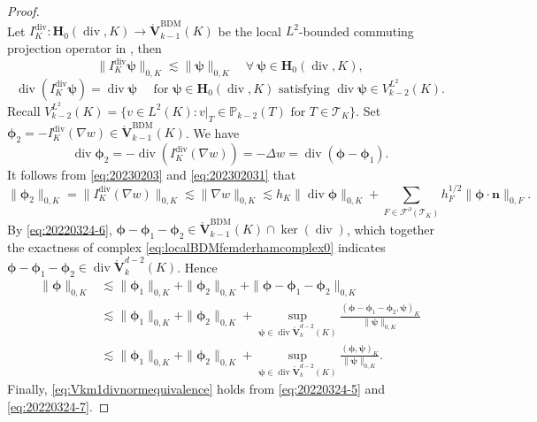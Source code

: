 \documentclass[10pt]{amsart}
\renewcommand{\div}{\operatorname{div}}
\numberwithin{equation}{section}
\begin{document}
\begin{proof}
\begin{equation}
\end{equation}
Let $I_K^{\div}: \boldsymbol{H}_0(\div,K)\to\mathring{\boldsymbol{V}}_{k-1}^{\mathrm{BDM}}(K)$ be the local $L^2$-bounded commuting projection operator in \cite{ArnoldGuzman2021,FalkWinther2014}, then
\begin{equation}\label{eq:20230203}  
\|I_K^{\div}\boldsymbol{\psi}\|_{0,K} \lesssim \|\boldsymbol{\psi}\|_{0,K}\quad\forall~\boldsymbol{\psi}\in \boldsymbol{H}_0(\div,K),
\end{equation}
\[
\div(I_K^{\div}\boldsymbol{\psi})=\div\boldsymbol{\psi} \quad \textrm{ for } \boldsymbol{\psi}\in \boldsymbol{H}_0(\div,K) \textrm{ satisfying } \div\boldsymbol{\psi}\in V_{k-2}^{L^2}(K).
\]
Recall $
V_{k-2}^{L^2}(K)=\{v\in L^2(K): v|_{T}\in \mathbb P_{k-2}(T) \textrm{ for } T\in\mathcal T_K\}
$. Set $\boldsymbol{\phi}_2=-I_K^{\div}(\nabla w)\in\mathring{\boldsymbol{V}}_{k-1}^{\mathrm{BDM}}(K)$. We have
\begin{equation}\label{eq:20220324-6}
\div\boldsymbol{\phi}_2=-\div(I_K^{\div}(\nabla w))=-\Delta w=\div(\boldsymbol{\phi}-\boldsymbol{\phi}_1).
\end{equation}
It follows from \eqref{eq:20230203} and \eqref{eq:202302031} that
\begin{equation}\label{eq:20220324-7}
\|\boldsymbol{\phi}_2\|_{0,K}=\|I_K^{\div}(\nabla w)\|_{0,K}\lesssim \|\nabla w\|_{0,K}\lesssim h_K\|\div\boldsymbol{\phi}\|_{0,K} +\sum_{F\in\mathcal F^{\partial}(\mathcal T_K)}h_F^{1/2}\|\boldsymbol{\phi}\cdot\boldsymbol{n}\|_{0,F}.
\end{equation}
By \eqref{eq:20220324-6}, $\boldsymbol{\phi}-\boldsymbol{\phi}_1-\boldsymbol{\phi}_2\in\mathring{\boldsymbol{V}}_{k-1}^{\mathrm{BDM}}(K)\cap\ker(\div)$, which together the exactness of complex \eqref{eq:localBDMfemderhamcomplex0} indicates $\boldsymbol{\phi}-\boldsymbol{\phi}_1-\boldsymbol{\phi}_2\in\div\mathring{\boldsymbol{V}}_{k}^{d-2}(K)$. Hence
\begin{align*}  
\|\boldsymbol{\phi}\|_{0,K}&\lesssim \|\boldsymbol{\phi}_1\|_{0,K}+\|\boldsymbol{\phi}_2\|_{0,K}+\|\boldsymbol{\phi}-\boldsymbol{\phi}_1-\boldsymbol{\phi}_2\|_{0,K} \\
&\lesssim \|\boldsymbol{\phi}_1\|_{0,K}+\|\boldsymbol{\phi}_2\|_{0,K}+\sup_{\boldsymbol{\psi}\in\div\mathring{\boldsymbol{V}}_{k}^{d-2}(K)}\frac{(\boldsymbol{\phi}-\boldsymbol{\phi}_1-\boldsymbol{\phi}_2, \boldsymbol{\psi})_K}{\|\boldsymbol{\psi}\|_{0,K}} \\
&\lesssim \|\boldsymbol{\phi}_1\|_{0,K}+\|\boldsymbol{\phi}_2\|_{0,K}+\sup_{\boldsymbol{\psi}\in\div\mathring{\boldsymbol{V}}_{k}^{d-2}(K)}\frac{(\boldsymbol{\phi}, \boldsymbol{\psi})_K}{\|\boldsymbol{\psi}\|_{0,K}}.
\end{align*}
Finally, \eqref{eq:Vkm1divnormequivalence} holds from \eqref{eq:20220324-5} and \eqref{eq:20220324-7}.
\end{proof}
\end{document}
